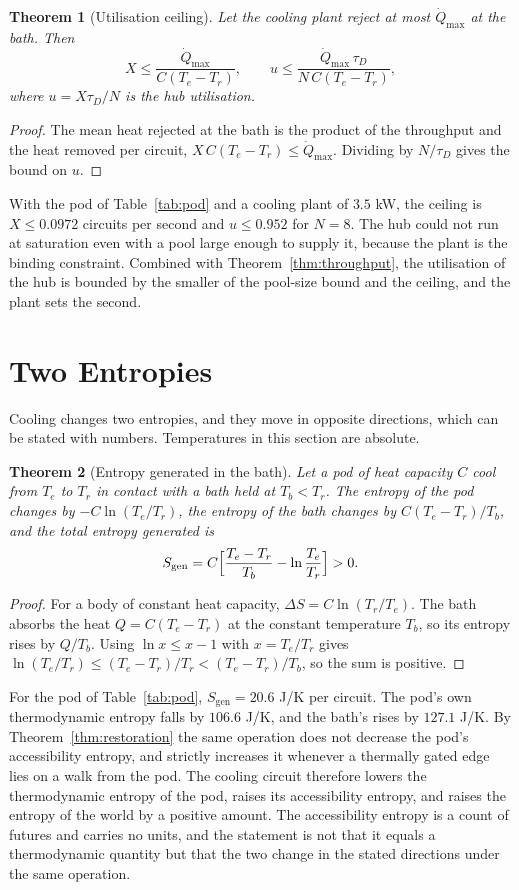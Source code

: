 \documentclass[11pt,openany]{book}
\theoremstyle{plain}
\newtheorem{theorem}{Theorem}[chapter]
\theoremstyle{definition}
\theoremstyle{remark}
\begin{document}
\begin{theorem}[Utilisation ceiling]
\label{thm:ceiling}
Let the cooling plant reject at most $\dot Q_{\max}$ at the bath. Then
\[
X\le\frac{\dot Q_{\max}}{C(T_e-T_r)},\qquad u\le\frac{\dot Q_{\max}\,\tau_D}{N\,C(T_e-T_r)},
\]
where $u=X\tau_D/N$ is the hub utilisation.
\end{theorem}
\begin{proof}
The mean heat rejected at the bath is the product of the throughput and the heat removed per circuit, $X\,C(T_e-T_r)\le\dot Q_{\max}$. Dividing by $N/\tau_D$ gives the bound on $u$.
\end{proof}

With the pod of Table~\ref{tab:pod} and a cooling plant of $3.5$ kW, the ceiling is $X\le0.0972$ circuits per second and $u\le0.952$ for $N=8$. The hub could not run at saturation even with a pool large enough to supply it, because the plant is the binding constraint. Combined with Theorem~\ref{thm:throughput}, the utilisation of the hub is bounded by the smaller of the pool-size bound and the ceiling, and the plant sets the second.

\section{Two Entropies}

Cooling changes two entropies, and they move in opposite directions, which can be stated with numbers. Temperatures in this section are absolute.

\begin{theorem}[Entropy generated in the bath]
\label{thm:entropy}
Let a pod of heat capacity $C$ cool from $T_e$ to $T_r$ in contact with a bath held at $T_b<T_r$. The entropy of the pod changes by $-C\ln(T_e/T_r)$, the entropy of the bath changes by $C(T_e-T_r)/T_b$, and the total entropy generated is
\[
S_{\mathrm{gen}}=C\Bigl[\frac{T_e-T_r}{T_b}-\ln\frac{T_e}{T_r}\Bigr]>0.
\]
\end{theorem}
\begin{proof}
For a body of constant heat capacity, $\Delta S=C\ln(T_r/T_e)$. The bath absorbs the heat $Q=C(T_e-T_r)$ at the constant temperature $T_b$, so its entropy rises by $Q/T_b$. Using $\ln x\le x-1$ with $x=T_e/T_r$ gives $\ln(T_e/T_r)\le(T_e-T_r)/T_r<(T_e-T_r)/T_b$, so the sum is positive.
\end{proof}

For the pod of Table~\ref{tab:pod}, $S_{\mathrm{gen}}=20.6$ J/K per circuit. The pod's own thermodynamic entropy falls by $106.6$ J/K, and the bath's rises by $127.1$ J/K. By Theorem~\ref{thm:restoration} the same operation does not decrease the pod's accessibility entropy, and strictly increases it whenever a thermally gated edge lies on a walk from the pod. The cooling circuit therefore lowers the thermodynamic entropy of the pod, raises its accessibility entropy, and raises the entropy of the world by a positive amount. The accessibility entropy is a count of futures and carries no units, and the statement is not that it equals a thermodynamic quantity but that the two change in the stated directions under the same operation.
\end{document}
